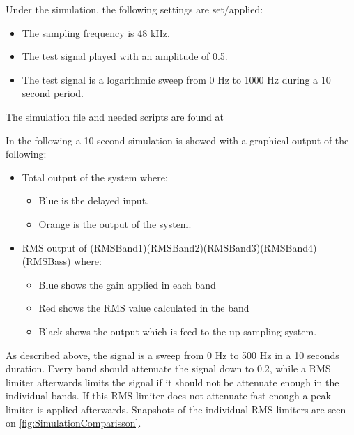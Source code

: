 Under the simulation, the following settings are set/applied:
\begin{itemize}
\item The sampling frequency is 48 kHz.
\item The test signal played with an amplitude of 0.5.
\item The test signal is a logarithmic sweep from 0 Hz to 1000 Hz during a 10 second period.
\end{itemize}

The simulation file and needed scripts are found at  


In the following a 10 second simulation is showed with a graphical output of the following:
\begin{itemize}
\item Total output of the system where:
\begin{itemize}
\item Blue is the delayed input.
\item Orange is the output of the system.
\end{itemize}
\item RMS output of (RMSBand1)(RMSBand2)(RMSBand3)(RMSBand4)(RMSBass) where:
\begin{itemize}
\item Blue shows the gain applied in each band
\item Red shows the RMS value calculated in the band
\item Black shows the output which is feed to the up-sampling system.
\end{itemize} 
\end{itemize}

As described above, the signal is a sweep from 0 Hz to 500 Hz in a 10 seconds duration. Every band should attenuate the signal down to 0.2, while a RMS limiter afterwards limits the signal if it should not be attenuate enough in the individual bands. If this RMS limiter does not attenuate fast enough a peak limiter is applied afterwards. Snapshots of the individual RMS limiters are seen on \autoref{fig:SimulationComparisson}.    

